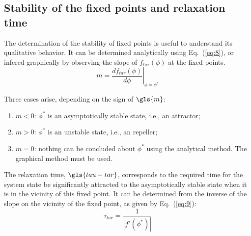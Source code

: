 \subsection{Stability of the fixed points and relaxation time}%
\label{sec:stab-fixed-points}
The determination of the stability of fixed points is useful to understand its
qualitative behavior. It can be determined analytically using Eq.~(\ref{eq:8}),
or infered graphically by observing the slope of $f_{tar}(\phi)$ at the fixed
points.
%
\begin{equation}
  \label{eq:8}
  m = \left. \frac{d f_{tar}(\phi)}{d \phi}\right|_{\phi = \phi^*}
\end{equation}

Three cases arise, depending on the sign of $\gls{m}$:
\begin{enumerate}
\item $m < 0$: $\phi^*$ is an asymptotically stable state, i.e., an attractor;
\item $m > 0$: $\phi^*$ is an unstable state, i.e., an repeller;
\item $m = 0$: nothing can be concluded about $\phi^*$ using the analytical
  method. The graphical method must be used.
\end{enumerate}

The relaxation time, $\gls{tau-tar}$, corresponds to the required time for the system state be
significantly attracted to the asymptotically stable state when it is in the
vicinity of this fixed point. It can be determined from the inverse of the slope
on the vicinity of the fixed point, as given by Eq.~(\ref{eq:9}):
\begin{equation}
  \label{eq:9}
  \tau_{tar} = \frac{1}{| f'(\phi^*) |}
\end{equation}

